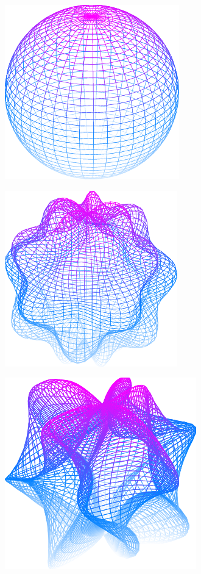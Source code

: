 \documentclass[11pt,openany]{article}
\begin{document}
\begin{center}
\begin{minipage}{.32\textwidth}\centering
	\includegraphics[scale=1]{../tikz/grad-math-tikz-pdf/sphere.pdf}
\end{minipage}\hfill
\begin{minipage}{.32\textwidth}\centering
	\includegraphics[scale=1]{../tikz/grad-math-tikz-pdf/sphere2.pdf}
\end{minipage}\hfill
\begin{minipage}{.32\textwidth}\centering
\includegraphics[scale=1]{../tikz/grad-math-tikz-pdf/sphere3.pdf}
\end{minipage}\hfill
\end{center}
\end{document}
